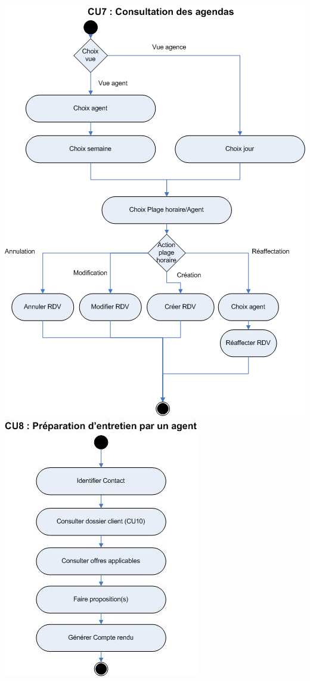 \begin {center}
\includegraphics{../../diagrammeActivite/DACU7.png}
\includegraphics{../../diagrammeActivite/DACU8.jpg}

\end{center}
